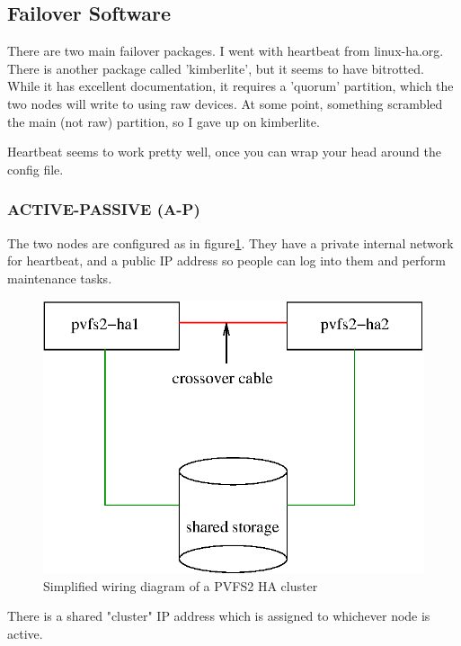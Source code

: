 \documentclass[11pt]{article}
\begin{document}
\subsection{Failover Software}

There are two main failover packages.  I went with heartbeat from
linux-ha.org.  There is another package called 'kimberlite', but it
seems to have bitrotted.  While it has excellent documentation, it
requires a 'quorum' partition, which the two nodes will write to using
raw devices.  At some point, something scrambled the main (not raw)
partition, so I gave up on kimberlite.  

Heartbeat seems to work pretty well, once you can wrap your head around
the config file.


\subsubsection{ACTIVE-PASSIVE (A-P)}

The two nodes are configured as in figure\ref{fig:nodes}.  They have a
private internal network for heartbeat, and a public IP address so
people can log into them and perform maintenance tasks.

\begin{figure}
\begin{center}
\includegraphics[scale=0.75]{pvfs2-failover.eps}
\end{center}
\caption{Simplified wiring diagram of a PVFS2 HA cluster}
\label{fig:nodes}
\end{figure}

There is a shared "cluster" IP address which is assigned to whichever
node is active. 
\end{document}
